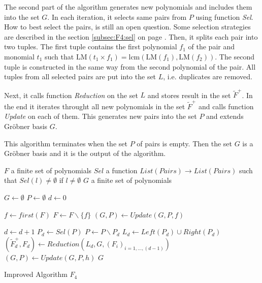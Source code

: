 The second part of the algorithm generates new polynomials and includes them into the set $G$. In each iteration, it selects same pairs from $P$ using function \textit{Sel}. How to best select the pairs, is still an open question. Some selection strategies are described in the section \ref{subsec:F4:sel} on page \pageref{subsec:F4:sel}. Then, it splits each pair into two tuples. The first tuple contains the first polynomial $f_1$ of the pair and monomial $t_1$ such that $\textrm{LM}(t_1 \times f_1) = \textrm{lcm}(\textrm{LM}(f_1),\textrm{LM}(f_2))$. The second tuple is constructed in the same way from the second polynomial of the pair. All tuples from all selected pairs are put into the set $L$, i.e. duplicates are removed.

Next, it calls function \textit{Reduction} on the set $L$ and stores result in the set $\tilde{F}^+$. In the end it iterates throught all new polynomials in the set $\tilde{F}^+$ and calls function \textit{Update} on each of them. This generates new pairs into the set $P$ and extends Gr\"obner basis $G$.

This algorithm terminates when the set $P$ of pairs is empty. Then the set $G$ is a Gr\"obner basis and it is the output of the algorithm.

\begin{algorithm}[ht]
  \begin{algorithmic}[1]
    \Require
      \Statex $F$ a finite set of polynomials
      \Statex $Sel$ a function $List(Pairs) \to List(Pairs)$ such that $Sel(l) \neq \emptyset$ if $l\neq\emptyset$
    \Ensure
      \Statex $G$ a finite set of polynomials
      \Statex

    \State $G \gets \emptyset$
    \State $P \gets \emptyset$
    \State $d \gets 0$

      \State $f \gets first(F)$
      \State $F \gets F\backslash \{f\}$
      \State $(G, P) \gets Update(G, P, f)$
    \EndWhile
    
      \State $d \gets d + 1$
      \State $P_d \gets Sel(P)$
      \State $P \gets P\backslash P_d$
      \State $L_d \gets Left(P_d) \cup Right(P_d)$
      \State $(\tilde{F}^+_d, F_d) \gets Reduction(L_d, G, (F_i)_{i=1,\ldots,(d-1)})$
        \State $(G, P) \gets Update(G, P, h)$
      \EndFor
    \EndWhile
    \State \Return $G$

  \end{algorithmic}
  \caption{Improved Algorithm $F_4$}
\end{algorithm}

